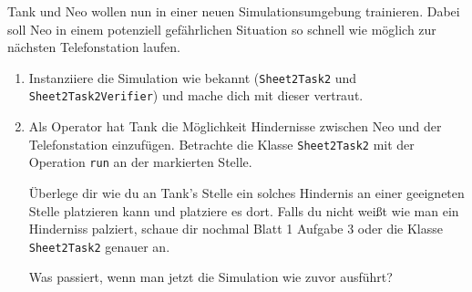 

Tank und Neo wollen nun in einer neuen Simulationsumgebung trainieren. 
Dabei soll Neo in einem potenziell gefährlichen Situation so schnell wie möglich zur nächsten Telefonstation laufen.

\begin{enumerate}
    \item Instanziiere die Simulation wie bekannt (\lstinline{Sheet2Task2} und \lstinline{Sheet2Task2Verifier}) und mache dich mit dieser vertraut.
    \item Als Operator hat Tank die Möglichkeit Hindernisse zwischen Neo und der Telefonstation einzufügen.
        Betrachte die Klasse \lstinline{Sheet2Task2} mit der Operation \lstinline{run} an der markierten Stelle.

        Überlege dir wie du an Tank's Stelle ein solches Hindernis an einer geeigneten Stelle platzieren kann und platziere es dort. Falls du nicht weißt wie man ein Hinderniss palziert, schaue dir nochmal Blatt 1 Aufgabe 3 oder die Klasse \lstinline{Sheet2Task2} genauer an.

        Was passiert, wenn man jetzt die Simulation wie zuvor ausführt?\\
        
\end{enumerate}

